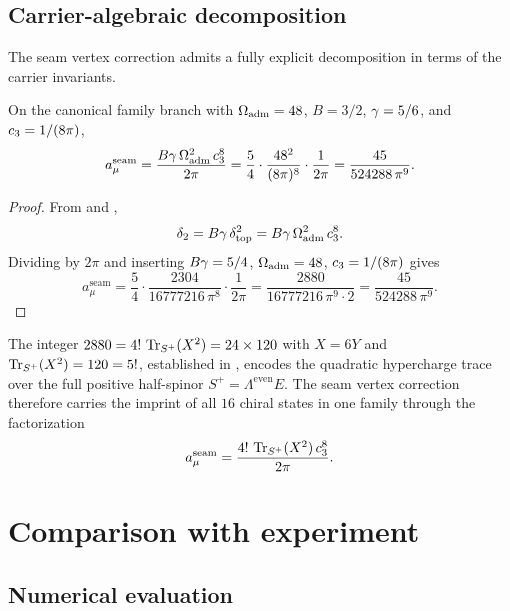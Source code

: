 \subsection{Carrier-algebraic decomposition}

The seam vertex correction admits a fully explicit decomposition in terms of
the carrier invariants.

\begin{corollary}
\label{cor:carrier-decomposition}
On the canonical family branch with $\Omega_{\mathrm{adm}}=48$, $B=3/2$, $\gamma=5/6$,
and $c_3=1/(8\pi)$,
\begin{equation}\label{eq:carrier-decomposition}
a_\mu^{\mathrm{seam}}
=
\frac{B\gamma\,\Omega_{\mathrm{adm}}^2\,c_3^8}{2\pi}
=
\frac{5}{4}\cdot\frac{48^2}{(8\pi)^8}\cdot\frac{1}{2\pi}
=
\frac{45}{524288\,\pi^9}.
\end{equation}
\end{corollary}

\begin{proof}
From  and ,
\[
\delta_2
=
B\gamma\,\delta_{\mathrm{top}}^2
=
B\gamma\,\Omega_{\mathrm{adm}}^2\,c_3^8.
\]
Dividing by $2\pi$ and inserting $B\gamma=5/4$, $\Omega_{\mathrm{adm}}=48$,
$c_3=1/(8\pi)$ gives
\[
a_\mu^{\mathrm{seam}}
=
\frac54\cdot\frac{2304}{16777216\,\pi^8}\cdot\frac{1}{2\pi}
=
\frac{2880}{16777216\,\pi^9\cdot 2}
=
\frac{45}{524288\,\pi^9}.
\]
\end{proof}

\begin{remark}
The integer $2880=4!\,\operatorname{Tr}_{S^+}(X^2)=24\times120$ with $X=6Y$ and
$\operatorname{Tr}_{S^+}(X^2)=120=5!$, established in \cite[Corollary~5.9]{TFPT31},
encodes the quadratic hypercharge trace over the full positive half-spinor
$S^+=\Lambda^{\mathrm{even}}E$. The seam vertex correction therefore
carries the imprint of all $16$ chiral states in one family through the
factorization
\[
a_\mu^{\mathrm{seam}}
=
\frac{4!\,\operatorname{Tr}_{S^+}(X^2)\,c_3^8}{2\pi}.
\]
\end{remark}


\section{Comparison with experiment}\label{sec:comparison}

\subsection{Numerical evaluation}

